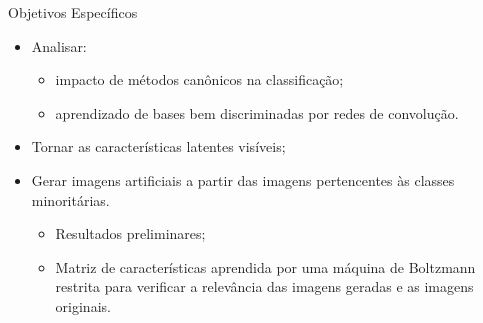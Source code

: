 \documentclass{beamer}
\begin{document}
\begin{frame}{Objetivos Específicos}
\setlength\leftmargini{1em}
\justifying
    \begin{itemize}
      \item Analisar: 
        \begin{itemize}
          \item impacto de métodos canônicos na classificação;
          \item aprendizado de bases bem discriminadas por redes de convolução.
        \end{itemize}
      \item Tornar as características latentes visíveis;%
      \item Gerar imagens artificiais a partir das imagens pertencentes às classes minoritárias. 
      \pause
        \begin{itemize}
          \item Resultados preliminares;
          \item Matriz de características aprendida por uma máquina de Boltzmann restrita para verificar a relevância das imagens geradas e as imagens originais.
        \end{itemize}
    \end{itemize}
\end{frame}
\end{document}
